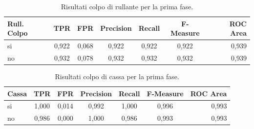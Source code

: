 \begin{table}[h!]
	\begin{center}
		\begin{tabular}{l|c|c|c|c|c|r} %
			\textbf{Rull. Colpo} & \textbf{TPR} & \textbf{FPR} & \textbf{Precision} & \textbf{Recall} & \textbf{F-Measure} & \textbf{ROC Area}\\
			\hline
			si & 0,922 & 0,068 & 0,922 & 0,922 & 0,922 & 0,939 \\
			no & 0,932 & 0,078 & 0,932 & 0,932 & 0,932 & 0,939 \\
		\end{tabular}
		\caption{Risultati colpo di rullante per la prima fase.}
		\label{tab:sn_hit_res_1}
	\end{center}
\end{table}

\begin{table}[h!]
	\begin{center}
		\begin{tabular}{l|c|c|c|c|c|r} %
			\textbf{Cassa} & \textbf{TPR} & \textbf{FPR} & \textbf{Precision} & \textbf{Recall} & \textbf{F-Measure} & \textbf{ROC Area}\\
			\hline
			si & 1,000 & 0,014 & 0,992 & 1,000 & 0,996 & 0,993 \\
			no & 0,986 & 0,000 & 1,000 & 0,986 & 0,993 & 0,993 \\
		\end{tabular}
		\caption{Risultati colpo di cassa per la prima fase.}
		\label{tab:kick_res_1}
	\end{center}
\end{table}


